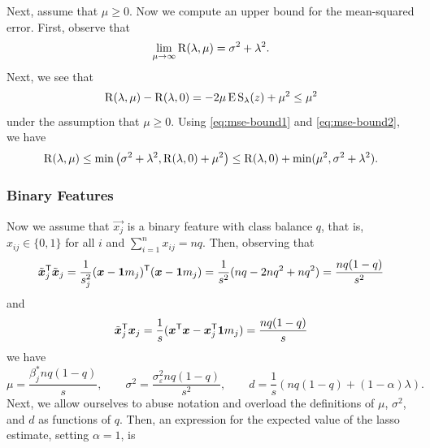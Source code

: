 Next, assume that \(\mu \geq 0\). Now we compute an upper bound for the mean-squared error. First, observe that
\begin{equation}
  \label{eq:mse-bound1}
  \lim_{\mu \rightarrow \infty} \operatorname{R}(\lambda, \mu) = \sigma^2 + \lambda^2.
\end{equation}
Next, we see that
\begin{equation}
  \label{eq:mse-bound2}
  \operatorname{R}(\lambda, \mu) - \operatorname{R}(\lambda, 0) = -2\mu \operatorname{E} \operatorname{S}_\lambda(z) + \mu^2 \leq \mu^2
\end{equation}
under the assumption that \(\mu \geq 0\). Using \eqref{eq:mse-bound1} and \eqref{eq:mse-bound2}, we have
\[
  \operatorname{R}(\lambda,\mu) \leq \min\big(\sigma^2 + \lambda^2, \operatorname{R}(\lambda, 0) + \mu^2\big) \leq \operatorname{R}(\lambda, 0) + \min(\mu^2, \sigma^2 + \lambda^2).
\]

\subsubsection{Binary Features}

Now we assume that \(\vec{x_j}\) is a binary feature with class balance \(q\), that is, \(x_{ij} \in \{0, 1\}\) for all \(i\) and \(\sum_{i=1}^n x_{ij} = nq\). Then, observing that
\[
  \tilde{\boldsymbol{x}}_j^{\mathsf{T}} \tilde{\boldsymbol{x}}_j = \frac{1}{s_j^2}(\boldsymbol{x} - \boldsymbol{1} m_j)^{\mathsf{T}} (\boldsymbol{x} - \boldsymbol{1} m_j) = \frac{1}{s^2}(nq - 2nq^2 + nq^2) = \frac{nq(1-q)}{s^2}
\]
and
\[
  \tilde{\boldsymbol{x}}_j^{\mathsf{T}} \boldsymbol{x}_j = \frac{1}{s}(\boldsymbol{x}^{\mathsf{T}} \boldsymbol{x} - \boldsymbol{x}_j^{\mathsf{T}} \boldsymbol{1} m_j) = \frac{nq(1 - q)}{s}
\]
we have
\[
  \mu = \frac{\beta^*_j nq(1 - q)}{s}, \qquad \sigma^2 = \frac{\sigma_\varepsilon^2nq(1 - q)}{s^2}, \qquad d = \frac{1}{s} \left(nq(1 -q) + (1-\alpha)\lambda\right).
\]
Next, we allow ourselves to abuse notation and overload the definitions of \(\mu\), \(\sigma^2\), and \(d\) as functions of \(q\). Then, an expression for the expected value of the lasso estimate, setting \(\alpha = 1\), is




